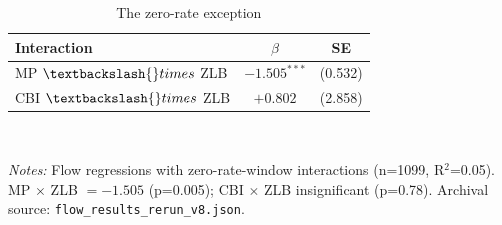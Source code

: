 \begin{table}[!tbp]
\centering\small
\caption{The zero-rate exception}
\label{tab:62}
\begin{tabular}{lcc}
\toprule
Interaction & $\beta$ & SE \\
\midrule
MP $\textbackslash\{\}times$ ZLB & $-1.505^{***}$ & (0.532) \\
CBI $\textbackslash\{\}times$ ZLB & $+0.802$ & (2.858) \\
\bottomrule
\end{tabular}
\\[2pt]\begin{minipage}{0.92\linewidth}\footnotesize\emph{Notes:} Flow regressions with zero-rate-window interactions (n=1099, R$^2$=0.05). MP $\times$ ZLB $=-1.505$ (p=0.005); CBI $\times$ ZLB insignificant (p=0.78). Archival source: \texttt{flow\_results\_rerun\_v8.json}.\end{minipage}
\end{table}
